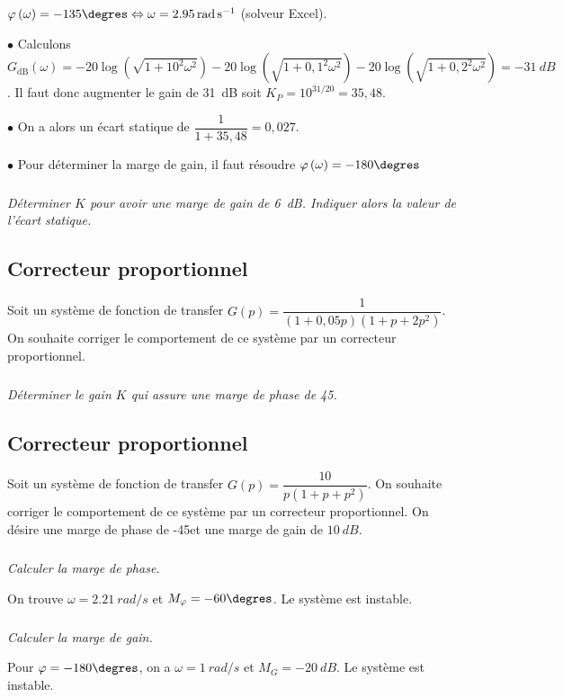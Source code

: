 \documentclass[10pt,fleqn]{article} %
\begin{document}
\begin{multicols}{2}
\begin{corrige}
$\varphi\left(\omega\right)=-135\degres \Leftrightarrow \omega = \SI{2,95}{rad.s^{-1}}$ (solveur Excel). 

$\bullet$ Calculons $G_{\text{dB}}(\omega)=-20\log\left(\sqrt{1+10^2\omega^2} \right)-20\log\left(\sqrt{1+0,1^2\omega^2} \right)-20\log\left(\sqrt{1+0,2^2\omega^2} \right)=\SI{-31}{dB}$. Il faut donc augmenter le gain de \SI{31}{dB} soit $K_P=10^{31/20}=35,48$.


$\bullet$ On a alors un écart statique de $\dfrac{1}{1+35,48}=0,027$.

$\bullet$ Pour déterminer la marge de gain, il faut résoudre $\varphi\left(\omega\right)=-180\degres$
\end{corrige}

\subparagraph{}\textit{Déterminer $K$ pour avoir une marge de gain de \SI{6}{dB}. Indiquer alors la valeur de l'écart statique.}
\begin{corrige}
\end{corrige}


\subsection*{Correcteur proportionnel} %
Soit un système de fonction de transfer $G(p)=\dfrac{1}{\left(1+0,05p\right)\left(1+p+2p^2\right)}$. On souhaite corriger le comportement de ce système par un correcteur proportionnel.
\subparagraph*{}\textit{Déterminer le gain $K$ qui assure une marge de phase de 45\degres.}


\subsection*{Correcteur proportionnel}
\setcounter{exo}{0}
Soit un système de fonction de transfer $G(p)=\dfrac{10}{p\left(1+p+p^2\right)}$. On souhaite corriger le comportement de ce système par un correcteur proportionnel. On désire une marge de phase de -45\degres et une marge de gain de $\SI{10}{dB}$.

\subparagraph{}\textit{Calculer la marge de phase.}
\ifprof
\begin{corrige}
On trouve $\omega=\SI{2,21}{rad/s}$ et $M_{\varphi}=-60\degres$. Le système est instable.
\end{corrige}
\else
\fi

\subparagraph{}\textit{Calculer la marge de gain.}
\ifprof
\begin{corrige}
Pour $\varphi=-180\degres$, on a $\omega=\SI{1}{rad/s}$ et $M_{G}=\SI{-20}{dB}$. Le système est instable.
\end{corrige}
\else
\fi


\end{multicols}
\end{document}
